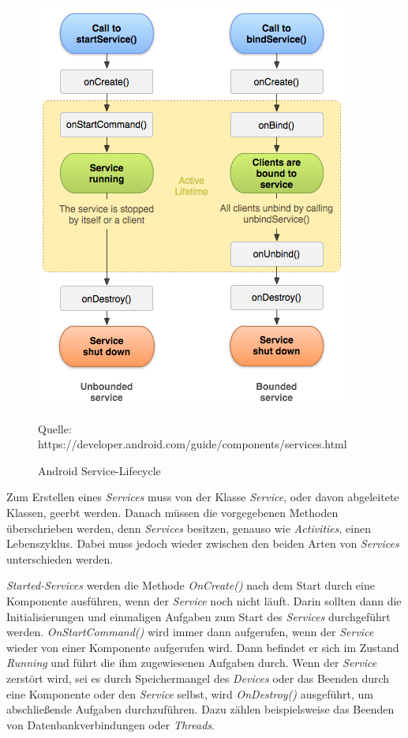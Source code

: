 \begin{figure}[h]
\centering
\includegraphics[width=0.8\linewidth]{content/images/Android-ServiceLifecycle}
\caption{Android Service-Lifecycle}
Quelle: https://developer.android.com/guide/components/services.html
\label{pic:androidServiceLifecycle}
\end{figure}

Zum Erstellen eines \textit{Services} muss von der Klasse \textit{Service}, oder davon abgeleitete Klassen, geerbt werden. Danach müssen die vorgegebenen Methoden überschrieben werden, denn \textit{Services} besitzen, genauso wie \textit{Activities}, einen Lebenszyklus. Dabei muss jedoch wieder zwischen den beiden Arten von \textit{Services} unterschieden werden.

\textit{Started-Services} werden die Methode \textit{OnCreate()} nach dem Start durch eine Komponente ausführen, wenn der \textit{Service} noch nicht läuft. Darin sollten dann die Initialisierungen und einmaligen Aufgaben zum Start des \textit{Services} durchgeführt werden. \textit{OnStartCommand()} wird immer dann aufgerufen, wenn der \textit{Service} wieder von einer Komponente aufgerufen wird. Dann befindet er sich im Zustand \textit{Running} und führt die ihm zugewiesenen Aufgaben durch. Wenn der \textit{Service} zerstört wird, sei es durch Speichermangel des \textit{Devices} oder das Beenden durch eine Komponente oder den \textit{Service} selbst, wird \textit{OnDestroy()} ausgeführt, um abschließende Aufgaben durchzuführen. Dazu zählen beispielsweise das Beenden von Datenbankverbindungen oder \textit{Threads}.

